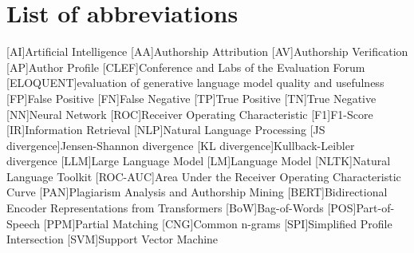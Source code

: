\chapter*{List of abbreviations}

\begin{acronym}[XXXXXXXXX]
    [AI]{Artificial Intelligence}
    [AA]{Authorship Attribution}
    [AV]{Authorship Verification}
    [AP]{Author Profile}
    [CLEF]{Conference and Labs of the Evaluation Forum}
    [ELOQUENT]{evaluation of generative language model quality and usefulness}
    [FP]{False Positive}
    [FN]{False Negative}
    [TP]{True Positive}
    [TN]{True Negative}
    [NN]{Neural Network}
    [ROC]{Receiver Operating Characteristic}
    [F1]{F1-Score}
    [IR]{Information Retrieval}
    [NLP]{Natural Language Processing}
    [JS divergence]{Jensen-Shannon divergence}
    [KL divergence]{Kullback-Leibler divergence}
    [LLM]{Large Language Model}
    [LM]{Language Model}
    [NLTK]{Natural Language Toolkit}
    [ROC-AUC]{Area Under the Receiver Operating Characteristic Curve}
    [PAN]{Plagiarism Analysis and Authorship Mining} %
    [BERT]{Bidirectional Encoder Representations from Transformers}
    [BoW]{Bag-of-Words}
    [POS]{Part-of-Speech}
    [PPM]{Partial Matching}
    [CNG]{Common n-grams}
    [SPI]{Simplified Profile Intersection}
    [SVM]{Support Vector Machine}

\end{acronym}
